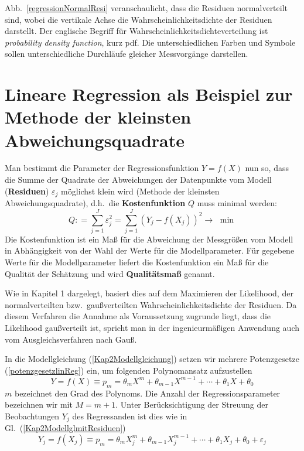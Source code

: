 Abb.~\ref{regressionNormalResi} veranschaulicht, dass die Residuen normalverteilt sind, wobei die vertikale Achse die Wahr\-schein\-lich\-keitsdichte der Residuen darstellt. \newline Der englische Begriff für Wahr\-schein\-lich\-keits\-dichte\-ver\-teil\-ung ist \textsl{probability density function}, kurz pdf. Die unterschiedlichen
Farben und Symbole sollen unterschiedliche Durchläufe gleicher Messvorgänge darstellen.

\section{Lineare Regression als Beispiel zur Methode der kleinsten Abweichungsquadrate}
Man bestimmt die Parameter der Regressionsfunktion $Y =
f(X)$ nun so, dass die Summe der Quadrate der
Abweichungen der Datenpunkte vom Modell (\textbf{Residuen}) $\varepsilon_j $ möglichst klein wird
(Methode der kleinsten Abweichungsquadrate),
d.h.\ die \textbf{Kostenfunktion} $Q$ muss minimal werden:
\begin{equation}
Q: = \sum\limits_{j = 1}^J {\varepsilon_j ^2 = } \sum\limits_{j = 1}^J {(Y_j
	- f(X_j ))^2 \to } \,\,\min
\label{eq:Minimimierung-kleinster-Fehlerquadrate}
\end{equation}
Die Kostenfunktion ist ein Maß für die Abweichung der Messgrößen vom Modell in Abhängigkeit von der
Wahl der Werte für die Modellparameter. Für gegebene Werte für die Modellparameter liefert die
Kostenfunktion ein Maß für die Qualität der Schätzung und wird \textbf{Qualitätsmaß} genannt.

Wie in Kapitel 1 dargelegt, basiert dies auf dem Maximieren der Likelihood, der
normalverteilten bzw.\ gaußverteilten Wahrscheinlichkeitsdichte der Residuen. Da diesem Verfahren
die Annahme als Voraussetzung zugrunde liegt, dass die Likelihood gaußverteilt ist, spricht man in der
ingenieurmäßigen Anwendung auch vom Ausgleichsverfahren nach Gauß.

In die Modellgleichung (\ref{Kap2Modellgleichung}) setzen wir mehrere Potenzgesetze (\ref{potenzgesetzlinReg})
ein, um folgenden Polynomansatz aufzustellen
\begin{equation}
Y = f(X) \equiv p_m = \theta _m X ^m + \theta _{m-1} X^{m - 1} +
\cdots + \theta _1 X + \theta _0
\end{equation}
$m$ bezeichnet den Grad des Polynoms. Die Anzahl der Regressionsparameter bezeichnen wir mit $M = m+1$.
Unter Berücksichtigung der Streuung der Beobachtungen $Y_j$ des Regressanden ist dies wie in Gl.~(\ref{Kap2ModellglmitResiduen})
\begin{equation}
Y_j = f(X_j) \equiv p_m = \theta _m X_j^m + \theta _{m-1} X_j^{m - 1} + \cdots +
\theta _1 X_j + \theta _0 + \varepsilon_j
\end{equation}

